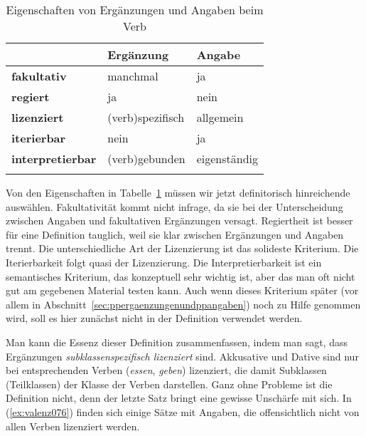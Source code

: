 \begin{table}[!htbp]
  \centering
  \begin{tabular}{lll}
    \lsptoprule
    & \textbf{Ergänzung} & \textbf{Angabe} \\
    \midrule
    \textbf{fakultativ} & manchmal & ja \\
    \textbf{regiert} & ja & nein \\
    \textbf{lizenziert} & (verb)spezifisch & allgemein \\
    \textbf{iterierbar} & nein & ja \\
    \textbf{interpretierbar} & (verb)gebunden & eigenständig \\
    \lspbottomrule
  \end{tabular}
  \caption{Eigenschaften von Ergänzungen und Angaben beim Verb}
  \label{tab:valenz075}
\end{table}

Von den Eigenschaften in Tabelle~\ref{tab:valenz075} müssen wir jetzt definitorisch hinreichende auswählen.
Fakultativität kommt nicht infrage, da sie bei der Unterscheidung zwischen Angaben und fakultativen Ergänzungen versagt.
Regiertheit ist besser für eine Definition tauglich, weil sie klar zwischen Ergänzungen und Angaben trennt.
Die unterschiedliche Art der Lizenzierung ist das solideste Kriterium.
Die Iterierbarkeit folgt quasi der Lizenzierung.
Die Interpretierbarkeit ist ein semantisches Kriterium, das konzeptuell sehr wichtig ist, aber das man oft nicht gut am gegebenen Material testen kann.
Auch wenn dieses Kriterium später (vor allem in Abschnitt~\ref{sec:ppergaenzungenundppangaben}) noch zu Hilfe genommen wird, soll es hier zunächst nicht in der Definition verwendet werden.


Man kann die Essenz dieser Definition zusammenfassen, indem man sagt, dass Ergänzungen \textit{subklassenspezifisch lizenziert} sind.
Akkusative und Dative sind \zB nur bei entsprechenden Verben (\zB \textit{essen}, \textit{geben}) lizenziert, die damit Subklassen (Teilklassen) der Klasse der Verben darstellen.
Ganz ohne Probleme ist die Definition nicht, denn der letzte Satz bringt eine gewisse Unschärfe mit sich.
In (\ref{ex:valenz076}) finden sich einige Sätze mit Angaben, die offensichtlich nicht von allen Verben lizenziert werden.

